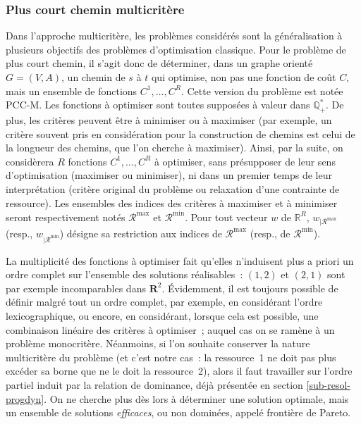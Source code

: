 \documentclass[10pt,francais]{llncs}
\begin{document}
{\subsubsection{Plus court chemin multicrit\`ere}\label{subsub-approx-multiobj-pres}
Dans l'approche multicrit\`ere, les probl\`emes consid\'er\'es sont la g\'en\'eralisation \`a plusieurs objectifs des probl\`emes d'optimisation classique. Pour le probl\`eme de plus court chemin, il s'agit donc de d\'eterminer, dans un graphe orient\'e $G=(V,A)$, un chemin de $s$ \`a $t$ qui optimise, non pas une fonction de co\^ut $C$, mais un ensemble de fonctions $C^1,\ldots,C^R$. Cette version du probl\`eme est not\'ee \textsc{PCC-M}. Les fonctions \`a optimiser sont toutes suppos\'ees \`a valeur dans $\mathbb{Q}_+^*$. De plus, les crit\`eres peuvent \^etre \`a minimiser ou \`a maximiser (par exemple, un crit\`ere souvent pris en consid\'eration pour la construction de chemins est celui de la longueur des chemins, que l'on cherche \`a maximiser). Ainsi, par la suite, on consid\`erera $R$ fonctions $C^1,\ldots,C^R$ \`a optimiser, sans pr\'esupposer de leur sens d'optimisation (maximiser ou minimiser), ni dans un premier temps de leur interpr\'etation (crit\`ere original du probl\`eme ou relaxation d'une contrainte de ressource). Les ensembles des indices des crit\`eres \`a maximiser et \`a minimiser seront respectivement not\'es $\mathscr{R}^{\max}$ et $\mathscr{R}^{\min}$. Pour tout vecteur $w$ de $\mathbb{R}^{R}$, $w_{|\mathscr{R}^{\max}}$ (resp., $w_{|\mathscr{R}^{\min}}$) d\'esigne sa restriction aux indices de $\mathscr{R}^{\max}$ (resp., de $\mathscr{R}^{\min}$).

La multiplicit\'e des fonctions \`a optimiser fait qu'elles n'induisent plus a priori un ordre complet sur l'ensemble des solutions r\'ealisables~: $(1,2)$ et $(2,1)$ sont par exemple incomparables dans $\mathbf{R}^2$. \'Evidemment, il est toujours possible de d\'efinir malgr\'e tout un ordre complet, par exemple, en consid\'erant l'ordre lexicographique, ou encore, en consid\'erant, lorsque cela est possible, une combinaison lin\'eaire des crit\`eres \`a optimiser~; auquel cas on se ram\`ene \`a un probl\`eme monocrit\`ere. N\'eanmoins, si l'on souhaite conserver la nature multicrit\`ere du probl\`eme (et c'est notre cas~: la ressource~1 ne doit pas plus exc\'eder sa borne que ne le doit la ressource~2), alors il faut travailler sur l'ordre partiel induit par la relation de dominance, d\'ej\`a pr\'esent\'ee en section \ref{sub-resol-progdyn}. On ne cherche plus d\`es lors \`a d\'eterminer une solution optimale, mais un ensemble de solutions {\em efficaces}, ou non domin\'ees, appel\'e fronti\`ere de Pareto.

}
\end{document}
